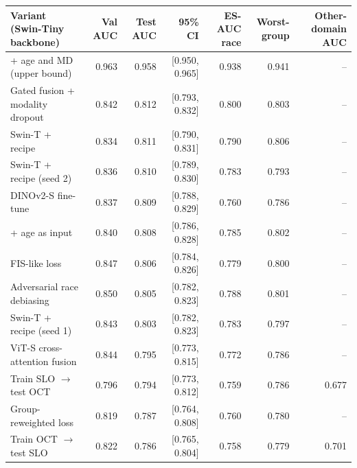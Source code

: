 \begin{tabular}{lrrrrrr}
\toprule
Variant (Swin-Tiny backbone) & Val AUC & Test AUC & 95\% CI & ES-AUC race & Worst-group & Other-domain AUC \\
\midrule
+ age and MD (upper bound) & 0.963 & 0.958 & [0.950, 0.965] & 0.938 & 0.941 & -- \\
Gated fusion + modality dropout & 0.842 & 0.812 & [0.793, 0.832] & 0.800 & 0.803 & -- \\
Swin-T + recipe & 0.834 & 0.811 & [0.790, 0.831] & 0.790 & 0.806 & -- \\
Swin-T + recipe (seed 2) & 0.836 & 0.810 & [0.789, 0.830] & 0.783 & 0.793 & -- \\
DINOv2-S fine-tune & 0.837 & 0.809 & [0.788, 0.829] & 0.760 & 0.786 & -- \\
+ age as input & 0.840 & 0.808 & [0.786, 0.828] & 0.785 & 0.802 & -- \\
FIS-like loss & 0.847 & 0.806 & [0.784, 0.826] & 0.779 & 0.800 & -- \\
Adversarial race debiasing & 0.850 & 0.805 & [0.782, 0.823] & 0.788 & 0.801 & -- \\
Swin-T + recipe (seed 1) & 0.843 & 0.803 & [0.782, 0.823] & 0.783 & 0.797 & -- \\
ViT-S cross-attention fusion & 0.844 & 0.795 & [0.773, 0.815] & 0.772 & 0.786 & -- \\
Train SLO $\to$ test OCT & 0.796 & 0.794 & [0.773, 0.812] & 0.759 & 0.786 & 0.677 \\
Group-reweighted loss & 0.819 & 0.787 & [0.764, 0.808] & 0.760 & 0.780 & -- \\
Train OCT $\to$ test SLO & 0.822 & 0.786 & [0.765, 0.804] & 0.758 & 0.779 & 0.701 \\
\bottomrule
\end{tabular}
